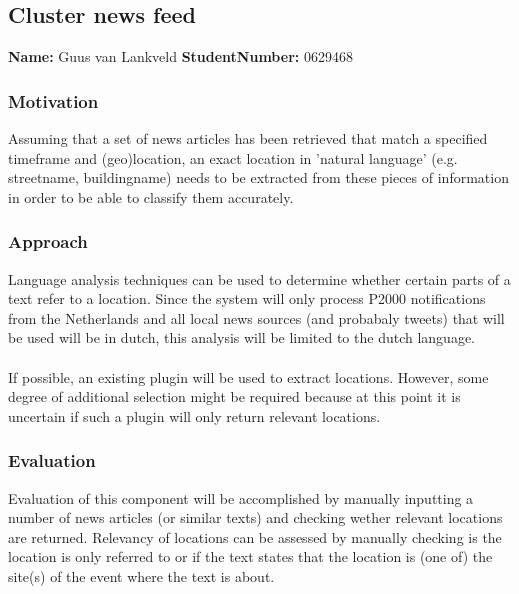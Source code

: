 \subsection{Cluster news feed}
\textbf{Name:}  Guus van Lankveld \indent \textbf{StudentNumber:} 0629468

\subsubsection*{Motivation}
Assuming that a set of news articles has been retrieved that match a specified timeframe and (geo)location, an exact location in 'natural language' (e.g. streetname, buildingname) needs to be extracted from these pieces of information in order to be able to classify them accurately. 

\subsubsection*{Approach}
Language analysis techniques can be used to determine whether certain parts of a text refer to a location. Since the system will only process P2000 notifications from the Netherlands and all local news sources (and probabaly tweets) that will be used will be in dutch, this analysis will be limited to the dutch language.\\\\
If possible, an existing plugin will be used to extract locations. However, some degree of additional selection might be required because at this point it is uncertain if such a plugin will only return relevant locations.

\subsubsection*{Evaluation }
Evaluation of this component will be accomplished by manually inputting a number of news articles (or similar texts) and checking wether relevant locations are returned. Relevancy of locations can be assessed by manually checking is the location is only referred to or if the text states that the location is (one of) the site(s) of the event where the text is about.